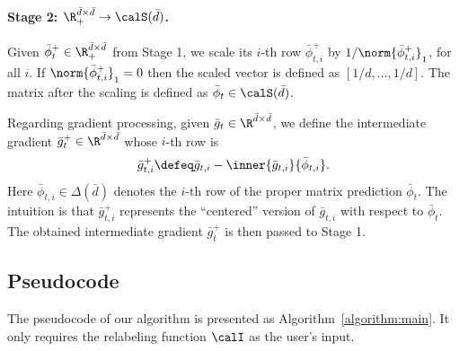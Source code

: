 \documentclass[10pt]{article}
\begin{document}
\paragraph{Stage 2: $\R_+^{\bar d\times\bar d}\rightarrow\calS(\bar d)$.} Given $\bar \phi^+_t\in\R^{\bar d\times\bar d}_+$ from Stage 1, we scale its $i$-th row $\bar\phi^+_{t,i}$ by $1/\norm{\bar\phi^+_{t,i}}_1$, for all $i$. If $\norm{\bar\phi^+_{t,i}}_1=0$ then the scaled vector is defined as $[1/d,\ldots,1/d]$. The matrix after the scaling is defined as $\bar\phi_t\in\calS(\bar d)$. 

Regarding gradient processing, given $\bar g_t\in\R^{\bar d\times\bar d}$, we define the intermediate gradient $\bar g_t^+\in\R^{\bar d\times\bar d}$ whose $i$-th row is
\begin{equation*}
\bar g^+_{t,i}\defeq\bar g_{t,i}-\inner{\bar g_{t,i}}{\bar\phi_{t,i}}.
\end{equation*}
Here $\bar\phi_{t,i}\in\Delta(\bar d)$ denotes the $i$-th row of the proper matrix prediction $\bar\phi_{t}$. The intuition is that $\bar g^+_{t,i}$ represents the ``centered'' version of $\bar g_{t,i}$ with respect to $\bar\phi_{t}$. The obtained intermediate gradient $\bar g_t^+$ is then passed to Stage 1. 

\subsection{Pseudocode}

The pseudocode of our algorithm is presented as Algorithm~\ref{algorithm:main}. It only requires the relabeling function $\calI$ as the user's input. 
\end{document}
